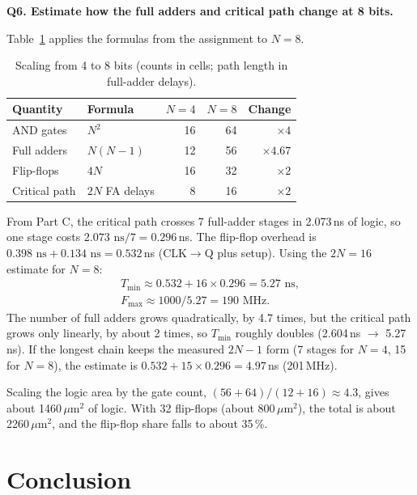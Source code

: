 \documentclass[10pt,a4paper,twocolumn]{article}
\newcommand{\umsq}{\,$\mu$m$^2$}
\newcommand{\Tmin}{$T_{\min}$}
\newcommand{\q}[1]{\par\smallskip\noindent\textbf{#1}\par}
\begin{document}
\q{Q6. Estimate how the full adders and critical path change at 8 bits.}
Table~\ref{tab:scale} applies the formulas from the assignment to $N = 8$.

\begin{table}[!htbp]
\centering\footnotesize
\begin{tabular}{llrrr}
\toprule
\textbf{Quantity} & \textbf{Formula} & \textbf{$N = 4$} & \textbf{$N = 8$} & \textbf{Change} \\
\midrule
AND gates & $N^2$ & 16 & 64 & $\times 4$ \\
Full adders & $N(N-1)$ & 12 & 56 & $\times 4.67$ \\
Flip-flops & $4N$ & 16 & 32 & $\times 2$ \\
Critical path & $2N$ FA delays & 8 & 16 & $\times 2$ \\
\bottomrule
\end{tabular}
\caption{Scaling from 4 to 8 bits (counts in cells; path length in full-adder delays).}
\label{tab:scale}
\end{table}

From Part C, the critical path crosses 7 full-adder stages in 2.073\,ns of logic, so one stage costs $2.073\text{ ns} / 7 = 0.296$\,ns. The flip-flop overhead is $0.398\text{ ns} + 0.134\text{ ns} = 0.532$\,ns (CLK$\to$Q plus setup). Using the $2N = 16$ estimate for $N = 8$:
\begin{gather*}
T_{\min} \approx 0.532 + 16 \times 0.296 = 5.27\text{ ns},\\
F_{\max} \approx 1000 / 5.27 = 190\text{ MHz}.
\end{gather*}
The number of full adders grows quadratically, by 4.7 times, but the critical path grows only linearly, by about 2 times, so \Tmin{} roughly doubles (2.604\,ns $\to$ 5.27\,ns). If the longest chain keeps the measured $2N - 1$ form (7 stages for $N = 4$, 15 for $N = 8$), the estimate is $0.532 + 15 \times 0.296 = 4.97$\,ns (201\,MHz).

Scaling the logic area by the gate count, $(56 + 64)/(12 + 16) \approx 4.3$, gives about 1460\umsq{} of logic. With 32 flip-flops (about 800\umsq), the total is about 2260\umsq, and the flip-flop share falls to about 35\,\%.

\section{Conclusion}
\end{document}

